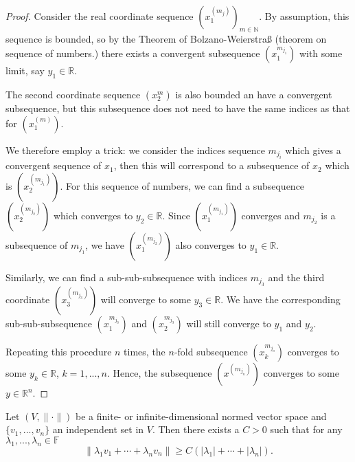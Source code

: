 \documentclass[10pt]{article}
\newcommand{\F}{\mathbb{F}}
\newcommand{\R}{\mathbb{R}}
\newcommand{\N}{\mathbb{N}}
\begin{document}
  \begin{proof}
    Consider the real coordinate sequence $\left(x_{1}^{(m_{j})}\right)_{m \in \N}$. 
    By assumption, this sequence is bounded, so by the Theorem of Bolzano-Weierstra{\ss} (theorem on sequence of numbers.)
    there exists a convergent subsequence $\left(x_{1}^{m_{j_{1}}}\right)$ with some limit, say $y_{1} \in \R$.

    The second coordinate sequence $\left(x_{2}^{m}\right)$ is also bounded an have a convergent subsequence, 
    but this subsequence does not need to have the same indices as that for $\left(x_{1}^{(m)}\right)$.

    We therefore employ a trick: we consider the indices sequence $m_{j_{i}}$ which gives a convergent sequence of $x_{1}$, then 
    this will correspond to a subsequence of $x_{2}$ which is $\left(x_{2}^{(m_{j_{1}})}\right)$.
    For this sequence of numbers, we can find a subsequence $\left(x_{2}^{(m_{j_{2}})}\right)$ which converges to $y_{2} \in \R$.
    Since $\left(x_{1}^{(m_{j_{1}})}\right)$ converges and $m_{j_{2}}$ is a subsequence of $m_{j_{1}}$, 
    we have $\left(x_{1}^{(m_{j_{2}})}\right)$ also converges to $y_{1} \in \R$.

    Similarly, we can find a sub-sub-subsequence with indices $m_{j_{3}}$ 
    and the third coordinate $\left(x_{3}^{(m_{j_{3}})}\right)$ will converge to some $y_{3} \in \R$.
    We have the corresponding sub-sub-subsequence $\left(x_{1}^{m_{j_{3}}}\right)$ and $\left(x_{2}^{m_{j_{3}}}\right)$
    will still converge to $y_{1}$ and $y_{2}$.

    Repeating this procedure $n$ times, the $n$-fold subsequence $\left(x_{k}^{m_{j_{n}}}\right)$ converges to some $y_{k} \in \R$,
    $k = 1,...,n$. Hence, the subsequence $\left(x^{(m_{j_{n}})}\right)$ converges to some $y \in \R^{n}$.
  \end{proof}

  \begin{lemma}
    Let $(V,\|\cdot\|)$ be a finite- or infinite-dimensional normed vector space and $\{v_{1},...,v_{n}\}$ an independent set in $V$.
    Then there exists a $C > 0$ such that for any $\lambda_{1},...,\lambda_{n} \in \F$
    \begin{equation}
      \big\|\lambda_{1}v_{1}+\cdots+\lambda_{n}v_{n}\big\| \geq C(|\lambda_{1}|+\cdots+|\lambda_{n}|).
    \end{equation}
  \end{lemma}
\end{document}
